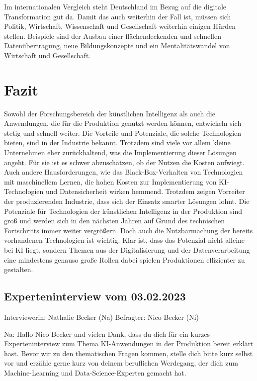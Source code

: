 \documentclass[a4paper,12pt, german]{report}
\begin{document}
Im internationalen Vergleich steht Deutschland im Bezug auf die digitale Transformation gut da. Damit das auch weiterhin der Fall ist, müssen sich Politik, Wirtschaft, Wissenschaft und Gesellschaft weiterhin einigen Hürden stellen. Beispiele sind der Ausbau einer flächendeckenden und schnellen Datenübertragung, neue Bildungskonzepte und ein Mentalitätswandel von Wirtschaft und Gesellschaft.\cite{36}

\chapter{Fazit}

Sowohl der Forschungsbereich der künstlichen Intelligenz als auch die Anwendungen, die für die Produktion genutzt werden können, entwickeln sich stetig und schnell weiter. Die Vorteile und Potenziale, die solche Technologien bieten, sind in der Industrie bekannt. Trotzdem sind viele vor allem kleine Unternehmen eher zurückhaltend, was die Implementierung dieser Lösungen angeht. Für sie ist es schwer abzuschätzen, ob der Nutzen die Kosten aufwiegt. Auch andere Hausforderungen, wie das Black-Box-Verhalten von Technologien mit maschinellem Lernen, die hohen Kosten zur Implementierung von KI-Technologien und Datensicherheit wirken hemmend. Trotzdem zeigen Vorreiter der produzierenden Industrie, dass sich der Einsatz smarter Lösungen lohnt. Die Potenziale für Technologien der künstlichen Intelligenz in der Produktion sind groß und werden sich in den nächsten Jahren auf Grund des technischen Fortschritts immer weiter vergrößern. Doch auch die Nutzbarmachung der bereits vorhandenen Technologien ist wichtig.\newline
Klar ist, dass das Potenzial nicht alleine bei KI liegt, sondern Themen aus der Digitalisierung und der Datenverarbeitung eine mindestens genauso große Rollen dabei spielen Produktionen effizienter zu gestalten.


\listoffigures

\clearpage




\appendix
{}
\section{Experteninterview vom 03.02.2023}
Interviewerin: Nathalie Becker (Na)
Befragter: Nico Becker (Ni)

Na: Hallo Nico Becker und vielen Dank, dass du dich für ein kurzes Experteninterview zum Thema KI-Anwendungen in der Produktion bereit erklärt hast. Bevor wir zu den thematischen Fragen kommen, stelle dich bitte kurz selbst vor und erzähle gerne kurz von deinem beruflichen Werdegang, der dich zum Machine-Learning und Data-Science-Experten gemacht hat.
\end{document}
